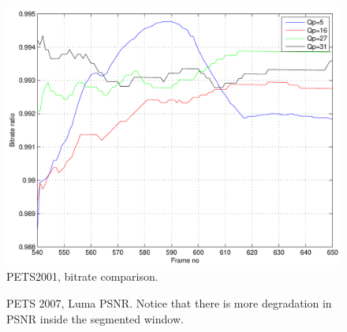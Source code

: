 \documentclass{article}
\begin{document}
\begin{figure}
			\centering
			\includegraphics[width=.22\textwidth]{figs/ICIP2009_PETS2001_bitRateRatio}
			\caption{PETS2001, bitrate comparison.}
			\label{fig:Bitrate_comparison_PETS2001}			
\end{figure}

\begin{figure}
			\centering

			\caption{PETS 2007, Luma PSNR.  Notice that there is more degradation in PSNR inside the segmented window.} 	
			\label{fig:PSNR_Comparison_PETS2001}	
\end{figure}
\end{document}
